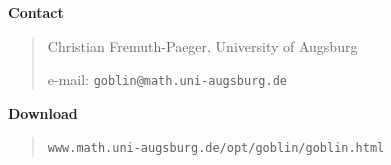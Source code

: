 \documentclass{report}
\begin{document}
\begin{landscape}
\clearpage
{\Huge\bf Contact}

\vspace*{1cm}
{\huge
\begin{quote} 
Christian Fremuth-Paeger, University of Augsburg
    
\medskip
e-mail: \verb/goblin@math.uni-augsburg.de/

\end{quote} 
}


\vspace*{3cm}
{\Huge\bf Download}

\vspace*{1cm}
{\huge
\begin{quote} 
\verb!www.math.uni-augsburg.de/opt/goblin/goblin.html!
\end{quote} 

}



\end{landscape}
\end{document}
